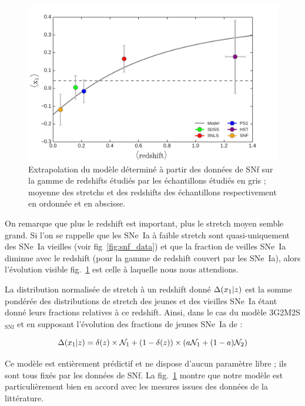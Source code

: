 \documentclass[a4paper, 12pt, svgnames]{article}
\begin{document}
\begin{figure}[htbp!]
    \centering
    \includegraphics[width=.7\linewidth]{Rapport_figures/model_snf.pdf}
    \captionsetup{justification=centering}
    \caption{Extrapolation du modèle déterminé à partir des données de SNf sur
    la gamme de redshifts étudiés par les échantillons étudiés en gris ; moyenne
des stretchs et des redshifts des échantillons respectivement en ordonnée et en
abscisse.}
    \label{fig:model_snf}
\end{figure}

On remarque que plus le redshift est important, plus le stretch moyen semble
grand. Si l'on se rappelle que les SNe~Ia à faible stretch sont quasi-uniquement
des SNe~Ia vieilles (voir fig~\ref{fig:snf_data}) et que la fraction de veilles
SNe~Ia diminue avec le redshift (pour la gamme de redshift couvert par les
SNe~Ia), alors l'évolution visible fig.~\ref{fig:model_snf} est celle à laquelle
nous nous attendions. \bigbreak

La distribution normalisée de stretch à un redshift donné $\Delta(x_1 | z)$ est la
somme pondérée des distributions de stretch des jeunes et des vieilles SNe~Ia
étant donné leurs fractions relatives à ce redshift. Ainsi, dans le cas du
modèle 3G2M2S$_{\mathrm{SNf}}$ et en supposant l'évolution des fractions de
jeunes SNe~Ia de \cite{rigault_strong_2018} :

\begin{equation}
    \label{eq:dist}
    \Delta(x_1 | z) = \delta(z) \times\mathcal{N}_1 + \left(1-\delta(z)\right)\times \left(a\mathcal{N}_1 + (1-a) \mathcal{N}_2\right)
\end{equation}

Ce modèle est entièrement prédictif et ne dispose d'aucun paramètre libre ; ils
sont tous fixés par les données de SNf. La fig.~\ref{fig:model_snf} montre que
notre modèle est particulièrement bien en accord avec les mesures issues des
données de la littérature. \bigbreak
\end{document}
